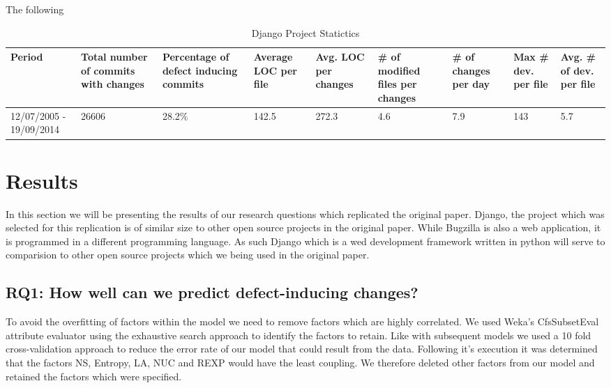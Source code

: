 \documentclass[10pt, conference]{IEEEtran}
\begin{document}
The following 

\begin{table*}[t]
	\caption{Django Project Statictics}
	\begin{tabular}{|p{2 cm}|p{1.5 cm}|p{1.5 cm}|p{1.5 cm}|p{1.5 cm}|p{1.5 cm}|p{1.5 cm}|p{1.5 cm}|p{1.5 cm}|}
		\hline 
		Period  & Total number of commits with changes  & Percentage of defect inducing commits  & Average LOC per file  & Avg. LOC per changes  & \# of modified files per changes  & \# of changes per day  & Max \# dev. per file  & Avg. \# of dev. per file \tabularnewline
		\hline 
		12/07/2005 - 19/09/2014  & 26606  & 28.2\% & 142.5 & 272.3 & 4.6 & 7.9 & 143 & 5.7 \\ \hline 
	\end{tabular}
	\label{table:statistics}	
\end{table*}


\section{Results}
\label{sec:results}

In this section we will be presenting the results of our research questions which replicated the original paper. Django, the project which was selected for this replication is of similar size to other open source projects in the original paper. While Bugzilla is also a web application, it is programmed in a different programming language. As such Django which is a wed development framework written in python will serve to comparision to other open source projects which we being used in the original paper.


\subsection{RQ1: How well can we predict defect-inducing changes?}
\label{sec:rq1}


To avoid the overfitting of factors within the model we need to remove factors which are highly correlated. We used Weka's CfsSubsetEval attribute evaluator using the exhaustive search approach to identify the factors to retain. Like with subsequent models we used a 10 fold cross-validation approach to reduce the error rate of our model that could result from the data. Following it's execution it was determined that the factors NS, Entropy, LA, NUC and REXP would have the least coupling. We therefore deleted other factors from our model and retained the factors which were specified.
\end{document}
